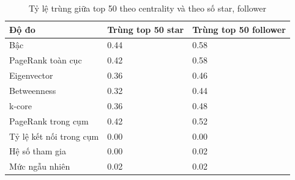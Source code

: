 \begin{table}[htbp]
\caption{Tỷ lệ trùng giữa top 50 theo centrality và theo số star, follower}
\label{tab:rq3_influencer}
\begin{tabular}{lll}
\toprule
Độ đo & Trùng top 50 star & Trùng top 50 follower \\
\midrule
Bậc & 0.44 & 0.58 \\
PageRank toàn cục & 0.42 & 0.58 \\
Eigenvector & 0.36 & 0.46 \\
Betweenness & 0.32 & 0.44 \\
k-core & 0.36 & 0.48 \\
PageRank trong cụm & 0.42 & 0.52 \\
Tỷ lệ kết nối trong cụm & 0.00 & 0.00 \\
Hệ số tham gia & 0.00 & 0.02 \\
Mức ngẫu nhiên & 0.02 & 0.02 \\
\bottomrule
\end{tabular}
\end{table}
